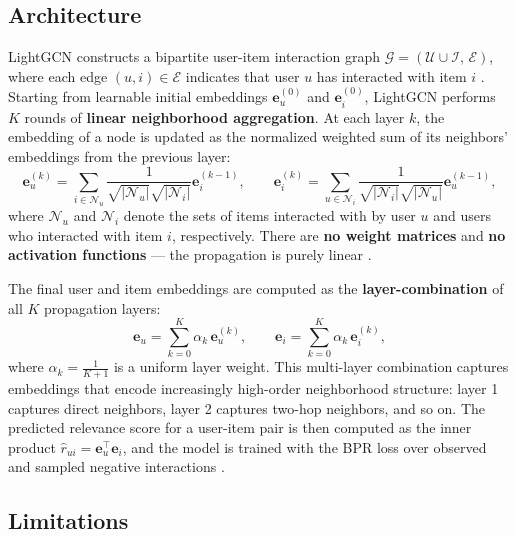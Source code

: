 \documentclass[12pt,a4paper]{report}
\newcommand{\parencite}[1]{\citep{#1}}
\begin{document}
\subsection{Architecture}

LightGCN constructs a bipartite user-item interaction graph
$\mathcal{G} = (\mathcal{U} \cup \mathcal{I},\, \mathcal{E})$,
where each edge $(u, i) \in \mathcal{E}$ indicates that user $u$
has interacted with item $i$ \parencite{he2020lightgcn}. Starting
from learnable initial embeddings $\mathbf{e}_u^{(0)}$ and
$\mathbf{e}_i^{(0)}$, LightGCN performs $K$ rounds of
\textbf{linear neighborhood aggregation}. At each layer $k$, the
embedding of a node is updated as the normalized weighted sum of
its neighbors' embeddings from the previous layer:
\begin{equation}
  \mathbf{e}_u^{(k)} =
    \sum_{i \in \mathcal{N}_u}
      \frac{1}{\sqrt{|\mathcal{N}_u|}\sqrt{|\mathcal{N}_i|}}
      \mathbf{e}_i^{(k-1)},
  \qquad
  \mathbf{e}_i^{(k)} =
    \sum_{u \in \mathcal{N}_i}
      \frac{1}{\sqrt{|\mathcal{N}_i|}\sqrt{|\mathcal{N}_u|}}
      \mathbf{e}_u^{(k-1)},
\end{equation}
where $\mathcal{N}_u$ and $\mathcal{N}_i$ denote the sets of
items interacted with by user $u$ and users who interacted with
item $i$, respectively. There are \textbf{no weight matrices} and
\textbf{no activation functions} --- the propagation is purely
linear \parencite{he2020lightgcn}.

The final user and item embeddings are computed as the
\textbf{layer-combination} of all $K$ propagation layers:
\begin{equation}
  \mathbf{e}_u = \sum_{k=0}^{K} \alpha_k\, \mathbf{e}_u^{(k)},
  \qquad
  \mathbf{e}_i = \sum_{k=0}^{K} \alpha_k\, \mathbf{e}_i^{(k)},
\end{equation}
where $\alpha_k = \frac{1}{K+1}$ is a uniform layer weight.
This multi-layer combination captures embeddings that encode
increasingly high-order neighborhood structure: layer 1 captures
direct neighbors, layer 2 captures two-hop neighbors, and so on.
The predicted relevance score for a user-item pair is then computed
as the inner product $\hat{r}_{ui} = \mathbf{e}_u^\top \mathbf{e}_i$,
and the model is trained with the BPR loss over observed and
sampled negative interactions \parencite{he2020lightgcn}.

\subsection{Limitations}
\end{document}
